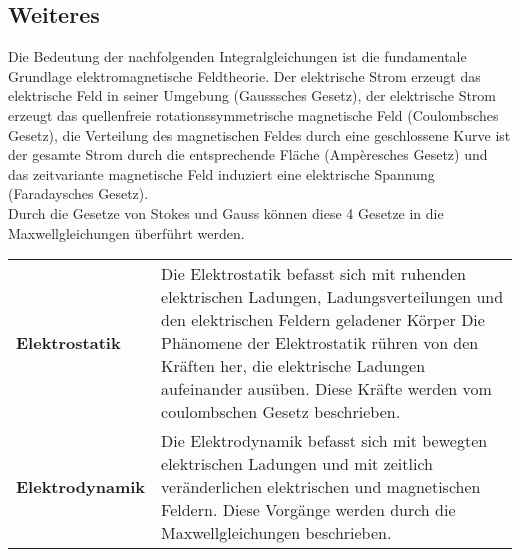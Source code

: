 \subsection{Weiteres}
Die Bedeutung der nachfolgenden Integralgleichungen ist die fundamentale Grundlage elektromagnetische Feldtheorie. Der elektrische Strom erzeugt das elektrische Feld in seiner Umgebung (Gausssches Gesetz), der elektrische Strom erzeugt das quellenfreie rotationssymmetrische magnetische Feld (Coulombsches Gesetz), die Verteilung des magnetischen Feldes durch eine geschlossene Kurve ist der gesamte Strom durch die entsprechende Fläche (Ampèresches Gesetz) und das zeitvariante magnetische Feld induziert eine elektrische Spannung (Faradaysches Gesetz).\\
Durch die Gesetze von Stokes und Gauss können diese 4 Gesetze in die Maxwellgleichungen überführt werden. 
\vspace{-0.8cm}
\begin{longtable}{p{} p{}}
	\textbf{Elektrostatik} & Die Elektrostatik befasst sich mit ruhenden elektrischen Ladungen, Ladungsverteilungen und den elektrischen Feldern geladener Körper
	Die Phänomene der Elektrostatik rühren von den Kräften her, die elektrische Ladungen aufeinander ausüben. Diese Kräfte werden vom coulombschen Gesetz beschrieben.\\
	\textbf{Elektrodynamik} & Die Elektrodynamik befasst sich mit bewegten elektrischen Ladungen und mit zeitlich veränderlichen elektrischen und magnetischen Feldern. Diese Vorgänge werden durch die Maxwellgleichungen beschrieben. \\
\end{longtable}

\clearpage
\pagebreak